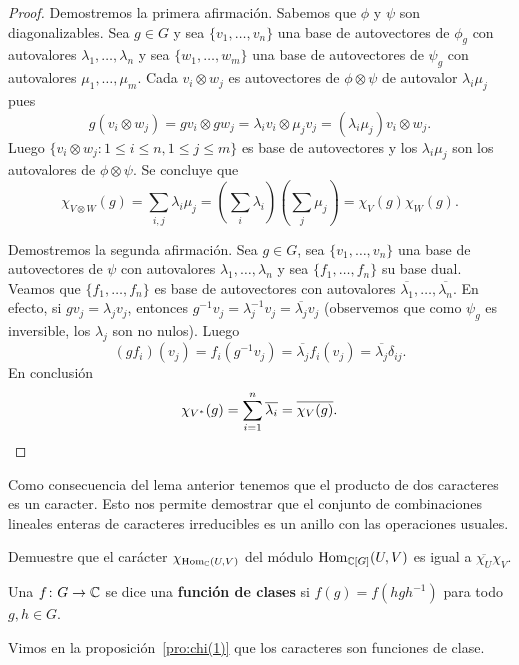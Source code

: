 \begin{proof}
	Demostremos la primera afirmación. 
	Sabemos que $\phi$ y $\psi$ son diagonalizables. Sea $g\in G$ y sea $\{v_1,\dots,v_n\}$
	una base de autovectores de $\phi_g$ con autovalores
	$\lambda_1,\dots,\lambda_n$ y sea $\{w_1,\dots,w_m\}$ una base de
	autovectores de $\psi_g$ con autovalores $\mu_1,\dots,\mu_m$. Cada
	$v_i\otimes w_j$ es autovectores de $\phi\otimes\psi$ de autovalor
	$\lambda_i\mu_j$ pues 
	\[
		g(v_i\otimes w_j)=gv_i\otimes gw_j=\lambda_iv_i\otimes \mu_jv_j=(\lambda_i\mu_j)v_i\otimes w_j.
	\]
	Luego 
	$\{v_i\otimes w_j:1\leq i\leq n,1\leq j\leq m\}$ es base de autovectores y
	los $\lambda_i\mu_j$ son los autovalores de $\phi\otimes\psi$. Se concluye que
	\[
	\chi_{V\otimes W}(g)=\sum_{i,j}\lambda_i\mu_j=(\sum_i\lambda_i)(\sum_j\mu_j)=\chi_V(g)\chi_W(g).
	\]

	Demostremos la segunda afirmación. Sea $g\in G$, sea $\{v_1,\dots,v_n\}$
	una base de autovectores de $\psi$ con autovalores
	$\lambda_1,\dots,\lambda_n$ y sea $\{f_1,\dots,f_n\}$ su base dual. Veamos que $\{f_1,\dots,f_n\}$ es base de autovectores
	con autovalores $\overline{\lambda_1},\dots,\overline{\lambda_n}$. En efecto, si $gv_j=\lambda_jv_j$, entonces
	$g^{-1}v_j=\lambda_j^{-1}v_j=\overline{\lambda_j}v_j$ (observemos que como $\psi_g$ es inversible, los $\lambda_j$ son no nulos). Luego
	\[
		(gf_i)(v_j)=f_i(g^{-1}v_j)=\overline{\lambda_j}f_i(v_j)=\overline{\lambda_j}\delta_{ij}.
	\]
	En conclusión
	\[
		\chi_{V^*}(g)=\sum_{i=1}^n\overline{\lambda_i}=\overline{\chi_V(g)}.\qedhere
	\]
\end{proof}

Como consecuencia del lema anterior tenemos que el producto de dos caracteres es un caracter. 
Esto nos permite demostrar que 
el conjunto de combinaciones lineales enteras de caracteres 
irreducibles es un anillo con las operaciones usuales. 

\begin{exercise}
	Demuestre que el carácter $\chi_{\operatorname{Hom}_{\mathbb{C}}(U,V)}$ del módulo $\operatorname{Hom}_{\mathbb{C}[G]}(U,V)$ es igual a
	$\overline{\chi_U}\chi_V$.
\end{exercise}

\begin{definition}
  \label{exercise:cf(G)}
  Una $f\colon G\to\mathbb{C}$ se dice una \textbf{función de clases} si
  $f(g)=f(hgh^{-1})$ para todo $g,h\in G$.  
\end{definition}

Vimos en la proposición~\ref{pro:chi(1)} que los caracteres son funciones de
clase. 

